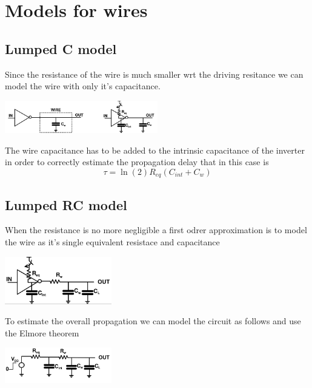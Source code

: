 \section{Models for wires}



\subsection{Lumped C model}
Since the resistance of the wire is much smaller wrt the driving resitance we can model the wire with only it's capacitance.

\centering
\includegraphics[width=0.5\textwidth]{C5_4.png}\\
\raggedright

The wire capacitance has to be added to the intrinsic capacitance of the inverter in order to correctly estimate the propagation delay that in this case is 
\begin{equation}
\tau=\ln(2)R_{eq}(C_{int}+C_w)
\end{equation}



\subsection{Lumped RC model}
When the resistance is no more negligible a first odrer approximation is to model the wire as it's single equivalent resistace and capacitance 

\centering
\includegraphics[width=0.35\textwidth]{C5_5.png}\\
\raggedright

To estimate the overall propagation we can model the circuit as follows and use the Elmore theorem

\centering
\includegraphics[width=0.35\textwidth]{C5_6.png}\\
\raggedright


